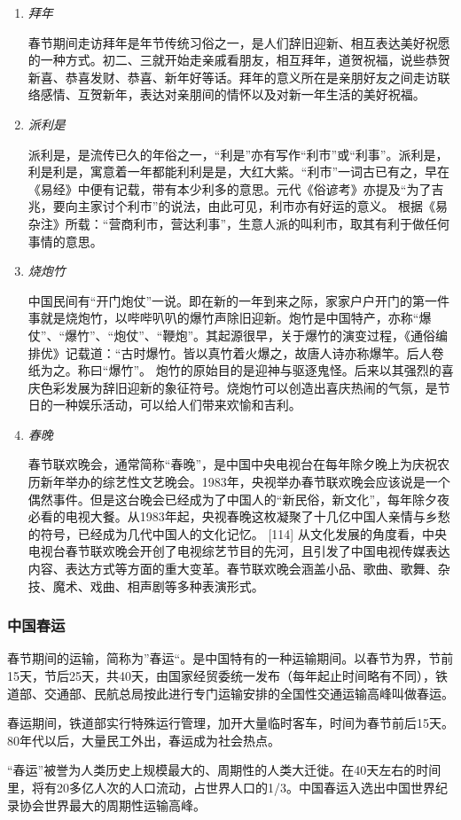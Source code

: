 \begin{enumerate}
\item \emph{拜年}

春节期间走访拜年是年节传统习俗之一，是人们辞旧迎新、相互表达美好祝愿的一种方式。初二、三就开始走亲戚看朋友，相互拜年，道贺祝福，说些恭贺新喜、恭喜发财、恭喜、新年好等话。拜年的意义所在是亲朋好友之间走访联络感情、互贺新年，表达对亲朋间的情怀以及对新一年生活的美好祝福。

\item \emph{派利是}

派利是，是流传已久的年俗之一，“利是”亦有写作“利市”或“利事”。派利是，利是利是，寓意着一年都能利利是是，大红大紫。“利市”一词古已有之，早在《易经》中便有记载，带有本少利多的意思。元代《俗谚考》亦提及“为了吉兆，要向主家讨个利市”的说法，由此可见，利市亦有好运的意义。 根据《易杂注》所载：“营商利市，营达利事”，生意人派的叫利市，取其有利于做任何事情的意思。

\item \emph{烧炮竹}

中国民间有“开门炮仗”一说。即在新的一年到来之际，家家户户开门的第一件事就是烧炮竹，以哔哔叭叭的爆竹声除旧迎新。炮竹是中国特产，亦称“爆仗”、“爆竹”、“炮仗”、“鞭炮”。其起源很早，关于爆竹的演变过程，《通俗编排优》记载道：“古时爆竹。皆以真竹着火爆之，故唐人诗亦称爆竿。后人卷纸为之。称曰“爆竹”。
炮竹的原始目的是迎神与驱逐鬼怪。后来以其强烈的喜庆色彩发展为辞旧迎新的象征符号。烧炮竹可以创造出喜庆热闹的气氛，是节日的一种娱乐活动，可以给人们带来欢愉和吉利。

\item \emph{春晚}

春节联欢晚会，通常简称“春晚”，是中国中央电视台在每年除夕晚上为庆祝农历新年举办的综艺性文艺晚会。1983年，央视举办春节联欢晚会应该说是一个偶然事件。但是这台晚会已经成为了中国人的“新民俗，新文化”，每年除夕夜必看的电视大餐。从1983年起，央视春晚这枚凝聚了十几亿中国人亲情与乡愁的符号，已经成为几代中国人的文化记忆。 [114] 
从文化发展的角度看，中央电视台春节联欢晚会开创了电视综艺节目的先河，且引发了中国电视传媒表达内容、表达方式等方面的重大变革。春节联欢晚会涵盖小品、歌曲、歌舞、杂技、魔术、戏曲、相声剧等多种表演形式。

\end{enumerate}

\subsubsection{中国春运}
\par
春节期间的运输，简称为”春运“。是中国特有的一种运输期间。以春节为界，节前15天，节后25天，共40天，由国家经贸委统一发布（每年起止时间略有不同），铁道部、交通部、民航总局按此进行专门运输安排的全国性交通运输高峰叫做春运。
\par
春运期间，铁道部实行特殊运行管理，加开大量临时客车，时间为春节前后15天。80年代以后，大量民工外出，春运成为社会热点。
\par
“春运”被誉为人类历史上规模最大的、周期性的人类大迁徙。在40天左右的时间里，将有20多亿人次的人口流动，占世界人口的1/3。中国春运入选出中国世界纪录协会世界最大的周期性运输高峰。


